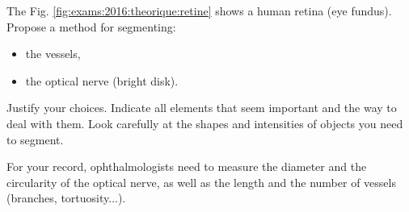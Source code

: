\begin{qbox}
 The Fig. \ref{fig:exams:2016:theorique:retine}  shows a human retina (eye fundus). Propose a method for segmenting:
 \begin{itemize}
  \item the vessels,
  \item the optical nerve (bright disk).
 \end{itemize}

 Justify your choices. Indicate all elements that seem important and the way to deal with them. Look carefully at the shapes and intensities of objects you need to segment.

 For your record, ophthalmologists need to measure the diameter and the circularity of the optical nerve, as well as the length and the number of vessels (branches, tortuosity...).
 
\end{qbox}


